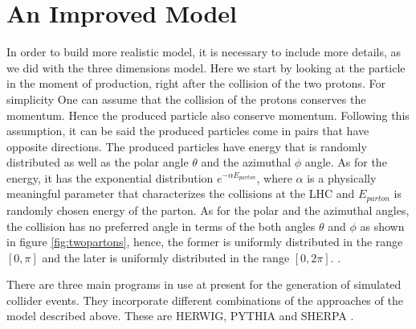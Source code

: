 \section{An Improved Model}
In order to build more realistic model, it is necessary to include more details, as we did with the three dimensions model. Here we start by looking at the particle in the moment of production, right after the collision of the two protons. For simplicity One can assume that the collision of the protons conserves the momentum. Hence the produced particle also conserve momentum. Following this assumption, it can be said the produced particles come in pairs that have opposite directions. The produced particles have energy that is randomly distributed as well as the polar angle $\theta$ and the azimuthal $\phi$ angle. As for the energy, it has the exponential distribution $e^{- \alpha E_{parton}}$, where $\alpha$ is a physically meaningful parameter that characterizes the collisions at the LHC and $E_{parton}$ is randomly chosen energy of the parton. As for the polar and the azimuthal angles, the collision has no preferred angle in terms of the both angles $\theta$ and $\phi$ as shown in figure \ref{fig:twopartons}, hence, the former is uniformly distributed in the range $[0, \pi]$ and the later is uniformly distributed in the range $[0,2 \pi]$. \citep{Salam:2010zt}.  
%


There are three main programs in use at present for the generation of simulated collider events. They incorporate different combinations of the approaches of the model described above. These are HERWIG, PYTHIA and SHERPA \citep{Buckley:2011ms}.      
